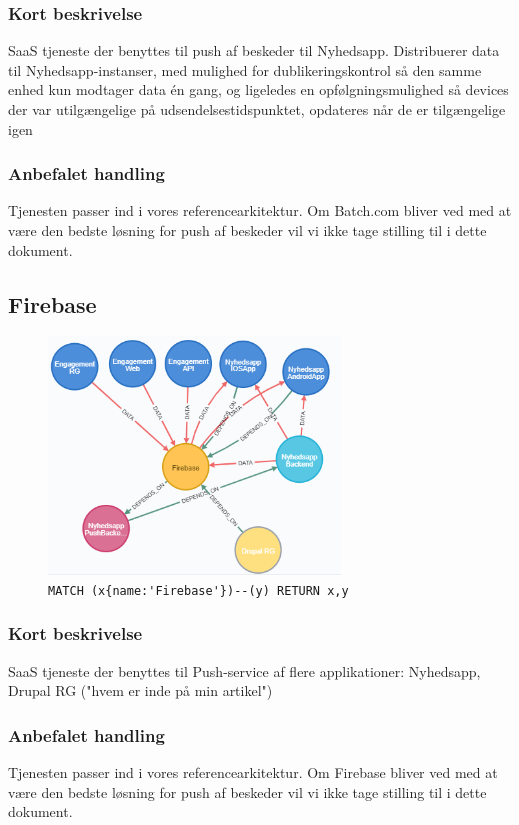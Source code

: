 \documentclass{article}
\begin{document}
\subsubsection*{Kort beskrivelse}
SaaS tjeneste der benyttes til push af beskeder til Nyhedsapp.
Distribuerer data til Nyhedsapp-instanser, med mulighed for dublikeringskontrol så den samme enhed kun modtager data én gang, og ligeledes en opfølgningsmulighed så devices der var utilgængelige på udsendelsestidspunktet, opdateres når de er tilgængelige igen
\subsubsection*{Anbefalet handling}
Tjenesten passer ind i vores referencearkitektur. Om Batch.com bliver ved med at være den bedste løsning for push af beskeder vil vi ikke tage stilling til i dette dokument.


\subsection{Firebase}
\begin{figure}[H]
\includegraphics[width=220pt]{Firebase.PNG}
\cprotect\caption{\verb|MATCH (x{name:'Firebase'})--(y) RETURN x,y|}
\end{figure}
\subsubsection*{Kort beskrivelse}
SaaS tjeneste der benyttes til Push-service af flere applikationer:
Nyhedsapp, Drupal RG ("hvem er inde på min artikel")
\subsubsection*{Anbefalet handling}
Tjenesten passer ind i vores referencearkitektur. Om Firebase bliver ved med at være den bedste løsning for push af beskeder vil vi ikke tage stilling til i dette dokument.
\end{document}
